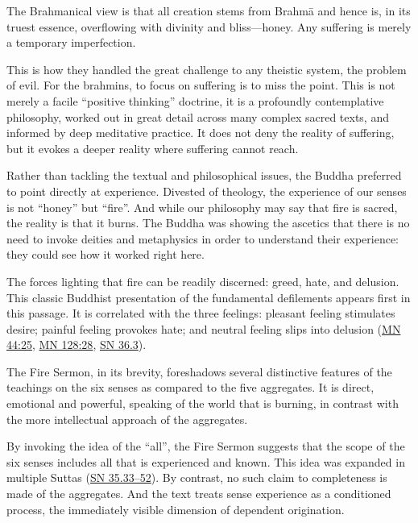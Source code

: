 \documentclass[12pt,openany]{book}%
\begin{document}
The Brahmanical view is that all creation stems from \textsanskrit{Brahmā} and hence is, in its truest essence, overflowing with divinity and bliss—honey. Any suffering is merely a temporary imperfection.

This is how they handled the great challenge to any theistic system, the problem of evil. For the brahmins, to focus on suffering is to miss the point. This is not merely a facile “positive thinking” doctrine, it is a profoundly contemplative philosophy, worked out in great detail across many complex sacred texts, and informed by deep meditative practice. It does not deny the reality of suffering, but it evokes a deeper reality where suffering cannot reach.

Rather than tackling the textual and philosophical issues, the Buddha preferred to point directly at experience. Divested of theology, the experience of our senses is not “honey” but “fire”. And while our philosophy may say that fire is sacred, the reality is that it burns. The Buddha was showing the ascetics that there is no need to invoke deities and metaphysics in order to understand their experience: they could see how it worked right here.

The forces lighting that fire can be readily discerned: greed, hate, and delusion. This classic Buddhist presentation of the fundamental defilements appears first in this passage. It is correlated with the three feelings: pleasant feeling stimulates desire; painful feeling provokes hate; and neutral feeling slips into delusion (\href{https://suttacentral.net/mn44\#25}{MN 44:25}, \href{https://suttacentral.net/mn128\#28}{MN 128:28}, \href{https://suttacentral.net/sn36.3}{SN 36.3}).

The Fire Sermon, in its brevity, foreshadows several distinctive features of the teachings on the six senses as compared to the five aggregates. It is direct, emotional and powerful, speaking of the world that is burning, in contrast with the more intellectual approach of the aggregates.

By invoking the idea of the “all”, the Fire Sermon suggests that the scope of the six senses includes all that is experienced and known. This idea was expanded in multiple Suttas (\href{https://suttacentral.net/sn35.33}{SN 35.33–52}). By contrast, no such claim to completeness is made of the aggregates. And the text treats sense experience as a conditioned process, the immediately visible dimension of dependent origination.
\end{document}
